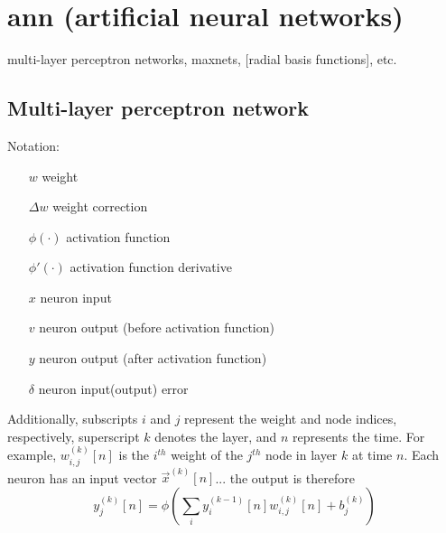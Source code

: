 % 
%

\section{ann (artificial neural networks)}
multi-layer perceptron networks, maxnets, [radial basis functions], etc.

\subsection{Multi-layer perceptron network}

Notation:
\begin{itemize}
    \item[$w$] weight
    \item[$\Delta w$] weight correction
    \item[$\phi(\cdot)$] activation function
    \item[$\phi'(\cdot)$] activation function derivative
    \item[$x$] neuron input
    \item[$v$] neuron output (before activation function)
    \item[$y$] neuron output (after activation function)
    \item[$\delta$] neuron input(output) error
\end{itemize}
Additionally, subscripts $i$ and $j$ represent the weight and node indices,
respectively, superscript $k$ denotes the layer, and $n$ represents the time.
For example, $w_{i,j}^{(k)}[n]$ is the $i^{th}$ weight of the $j^{th}$ node in
layer $k$ at time $n$.
Each neuron has an input vector $\vec{x}^{(k)}[n]$...
the output is therefore
\[
    y_j^{(k)}[n] = \phi\left( \sum_{i}{y_{i}^{(k-1)}[n] w_{i,j}^{(k)}[n]} + b_{j}^{(k)} \right)
\]
